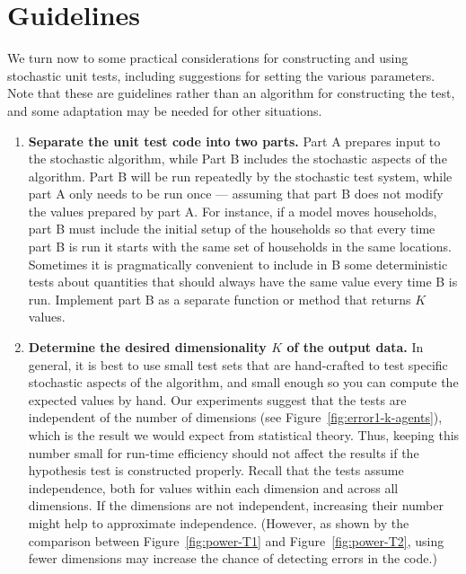 
\section{Guidelines}
\label{sec:guidelines}

We turn now to some practical considerations for constructing and using
stochastic unit tests, including suggestions for setting the various
parameters.  Note that these are guidelines rather than an
algorithm for constructing the test, and some adaptation may be needed for
other situations.

\begin{enumerate}

\item
{\bf Separate the unit test code into two parts.}  Part A prepares input to the
stochastic algorithm, while Part B includes the stochastic aspects of the
algorithm.  Part B will be run repeatedly by the stochastic test system,
while part A only needs to be run once --- assuming that part B does not
modify the values prepared by part A\@.  For instance, if a model moves
households, part B must include the initial setup of the households so that
every time part B is run it starts with the same set of households in the
same locations.  Sometimes it is pragmatically convenient to include in B
some deterministic tests about quantities that should always have the same
value every time B is run.  Implement part B as a separate function or
method that returns $K$ values.

\item
{\bf Determine the desired dimensionality $K$ of the output data.}  In
general, it is best to use small test sets that are hand-crafted to test
specific stochastic aspects of the algorithm, and small enough so you can
compute the expected values by hand.  Our experiments suggest that the
tests are independent of the number of dimensions (see
Figure~\ref{fig:error1-k-agents}), which is the result we would expect from
statistical theory.  Thus, keeping this number small for run-time
efficiency should not affect the results if the hypothesis test is
constructed properly.  Recall that the tests assume independence, both for
values within each dimension and across all dimensions.  If the dimensions
are not independent, increasing their number might help to approximate
independence.  (However, as shown by the comparison between
Figure~\ref{fig:power-T1} and Figure~\ref{fig:power-T2}, using fewer
dimensions may increase the chance of detecting errors in the code.)


\end{enumerate}
